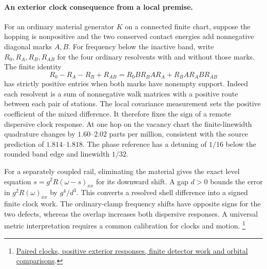 \documentclass[11pt]{article}
\begin{document}
\paragraph{An exterior clock consequence from a local premise.}
For an ordinary material generator \(K\) on a connected finite chart,
suppose the hopping is nonpositive and the two conserved contact
energies add nonnegative diagonal marks \(A,B\). For frequency below
the inactive band, write \(R_0,R_A,R_B,R_{AB}\) for the four ordinary
resolvents with and without those marks. The finite identity
\[
 R_0-R_A-R_B+R_{AB}
 = R_0 B R_B A R_A+R_B A R_A B R_{AB}
\]
has strictly positive entries when both marks have nonempty support.
Indeed each resolvent is a sum of nonnegative walk matrices with a
positive route between each pair of stations. The local covariance
measurement sets the positive coefficient of the mixed difference.
It therefore fixes the sign of a remote dispersive clock response.
At one hop on the vacancy chart the finite-linewidth quadrature
changes by \(1.60\)--\(2.02\) parts per million, consistent with the
source prediction of \(1.814\)--\(1.818\). The phase reference has a
detuning of \(1/16\) below the rounded band edge and linewidth \(1/32\).

For a separately coupled rail, eliminating the material gives the exact
level equation \(s=g^2 R(\omega-s)_{xx}\) for its downward shift.
A gap \(d>0\) bounds the error in \(g^2R(\omega)_{xx}\) by \(g^4/d^3\).
This converts a resolved shell difference into a signed finite clock
work. The ordinary-clamp frequency shifts have opposite signs for the
two defects, whereas the overlap increases both dispersive responses.
A universal metric interpretation requires a common calibration for
clocks and motion.%
\footnote{\href{https://github.com/FloatingPragma/observer-patch-holography/blob/main/model/experiments/interval_echo_shell_flux/product_address/green_response/material_recoil/overlap_source/native_boundary/stock/aperture/CLOCK_SOURCE_RESULTS.md}{Paired clocks, positive exterior responses, finite detector work and orbital comparisons}.}
\end{document}
